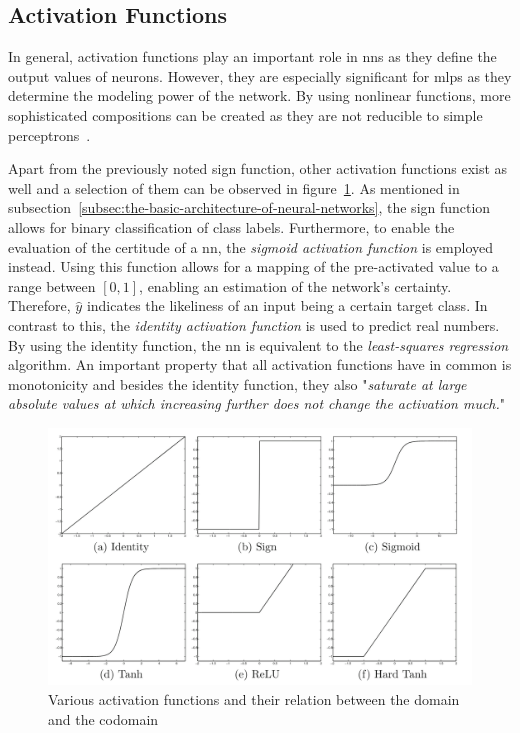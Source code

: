 \documentclass[draft,final]{vutinfth} %
\newcommand{\p}[1]{see p. #1}
\begin{document}
    \subsection{Activation Functions}
    In general, activation functions play an important role in \glspl{nn} as they define the output values of neurons.
    However, they are especially significant for \glspl{mlp} as they determine the modeling power of the network.
    By using nonlinear functions, more sophisticated compositions can be created as they are not reducible to simple perceptrons~\citep{aggarwal_neural_2018}.

    Apart from the previously noted sign function, other activation functions exist as well and a selection of them can be observed in figure~\ref{fig:activation_functions}.
    As mentioned in subsection~\ref{subsec:the-basic-architecture-of-neural-networks}, the sign function allows for binary classification of class labels.
    Furthermore, to enable the evaluation of the certitude of a \gls{nn}, the \textit{sigmoid activation function} is employed instead.
    Using this function allows for a mapping of the pre-activated value to a range between $[0,1]$, enabling an estimation of the network's certainty.
    Therefore, $\hat{y}$ indicates the likeliness of an input being a certain target class.
    In contrast to this, the \textit{identity activation function} is used to predict real numbers.
    By using the identity function, the \gls{nn} is equivalent to the \textit{least-squares regression} algorithm.
    An important property that all activation functions have in common is monotonicity and besides the identity function, they also "\textit{saturate at large absolute values at which increasing further does not change the activation much.}"\citep[\p{13}]{aggarwal_neural_2018}

    \begin{figure}[h]
        \centering
        \includegraphics[width=\textwidth]{figures/various_activation_functions.png}
        \caption[Various activation functions and their relation between the domain and the codomain]{Various activation functions and their relation between the domain and the codomain\protect\footnotemark}
        \label{fig:activation_functions}
    \end{figure}
\end{document}
